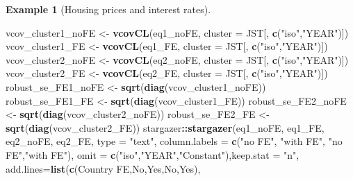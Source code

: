 \documentclass[
  12pt,
]{book}
\newenvironment{Shaded}{\begin{snugshade}}{\end{snugshade}}
\newcommand{\AttributeTok}[1]{\textcolor[rgb]{0.13,0.29,0.53}{#1}}
\newcommand{\FunctionTok}[1]{\textcolor[rgb]{0.13,0.29,0.53}{\textbf{#1}}}
\newcommand{\NormalTok}[1]{#1}
\newcommand{\OtherTok}[1]{\textcolor[rgb]{0.56,0.35,0.01}{#1}}
\newcommand{\SpecialCharTok}[1]{\textcolor[rgb]{0.81,0.36,0.00}{\textbf{#1}}}
\newcommand{\StringTok}[1]{\textcolor[rgb]{0.31,0.60,0.02}{#1}}
\theoremstyle{definition}
\theoremstyle{definition}
\newtheorem{example}{Example}[chapter]
\theoremstyle{definition}
\theoremstyle{definition}
\theoremstyle{remark}
\begin{document}
\begin{example}[Housing prices and interest rates]
\begin{Shaded}
\begin{Highlighting}[]
\NormalTok{vcov\_cluster1\_noFE }\OtherTok{\textless{}{-}} \FunctionTok{vcovCL}\NormalTok{(eq1\_noFE, }\AttributeTok{cluster =}\NormalTok{ JST[, }\FunctionTok{c}\NormalTok{(}\StringTok{"iso"}\NormalTok{,}\StringTok{"YEAR"}\NormalTok{)])}
\NormalTok{vcov\_cluster1\_FE   }\OtherTok{\textless{}{-}} \FunctionTok{vcovCL}\NormalTok{(eq1\_FE, }\AttributeTok{cluster =}\NormalTok{ JST[, }\FunctionTok{c}\NormalTok{(}\StringTok{"iso"}\NormalTok{,}\StringTok{"YEAR"}\NormalTok{)])}
\NormalTok{vcov\_cluster2\_noFE }\OtherTok{\textless{}{-}} \FunctionTok{vcovCL}\NormalTok{(eq2\_noFE, }\AttributeTok{cluster =}\NormalTok{ JST[, }\FunctionTok{c}\NormalTok{(}\StringTok{"iso"}\NormalTok{,}\StringTok{"YEAR"}\NormalTok{)])}
\NormalTok{vcov\_cluster2\_FE   }\OtherTok{\textless{}{-}} \FunctionTok{vcovCL}\NormalTok{(eq2\_FE, }\AttributeTok{cluster =}\NormalTok{ JST[, }\FunctionTok{c}\NormalTok{(}\StringTok{"iso"}\NormalTok{,}\StringTok{"YEAR"}\NormalTok{)])}
\NormalTok{robust\_se\_FE1\_noFE }\OtherTok{\textless{}{-}} \FunctionTok{sqrt}\NormalTok{(}\FunctionTok{diag}\NormalTok{(vcov\_cluster1\_noFE))}
\NormalTok{robust\_se\_FE1\_FE   }\OtherTok{\textless{}{-}} \FunctionTok{sqrt}\NormalTok{(}\FunctionTok{diag}\NormalTok{(vcov\_cluster1\_FE))}
\NormalTok{robust\_se\_FE2\_noFE }\OtherTok{\textless{}{-}} \FunctionTok{sqrt}\NormalTok{(}\FunctionTok{diag}\NormalTok{(vcov\_cluster2\_noFE))}
\NormalTok{robust\_se\_FE2\_FE   }\OtherTok{\textless{}{-}} \FunctionTok{sqrt}\NormalTok{(}\FunctionTok{diag}\NormalTok{(vcov\_cluster2\_FE))}
\NormalTok{stargazer}\SpecialCharTok{::}\FunctionTok{stargazer}\NormalTok{(eq1\_noFE, eq1\_FE, eq2\_noFE, eq2\_FE, }\AttributeTok{type =} \StringTok{"text"}\NormalTok{,}
                     \AttributeTok{column.labels =} \FunctionTok{c}\NormalTok{(}\StringTok{"no FE"}\NormalTok{, }\StringTok{"with FE"}\NormalTok{, }\StringTok{"no FE"}\NormalTok{,}\StringTok{"with FE"}\NormalTok{),}
                     \AttributeTok{omit =} \FunctionTok{c}\NormalTok{(}\StringTok{"iso"}\NormalTok{,}\StringTok{"YEAR"}\NormalTok{,}\StringTok{"Constant"}\NormalTok{),}\AttributeTok{keep.stat =} \StringTok{"n"}\NormalTok{,}
                     \AttributeTok{add.lines=}\FunctionTok{list}\NormalTok{(}\FunctionTok{c}\NormalTok{(}\StringTok{\textquotesingle{}Country FE\textquotesingle{}}\NormalTok{,}\StringTok{\textquotesingle{}No\textquotesingle{}}\NormalTok{,}\StringTok{\textquotesingle{}Yes\textquotesingle{}}\NormalTok{,}\StringTok{\textquotesingle{}No\textquotesingle{}}\NormalTok{,}\StringTok{\textquotesingle{}Yes\textquotesingle{}}\NormalTok{),}

\end{Highlighting}
\end{Shaded}
\end{example}
\end{document}
